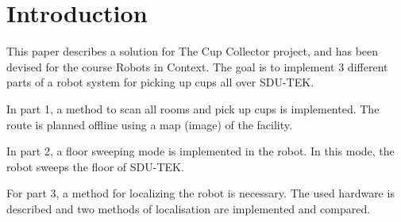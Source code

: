 \section{Introduction}
\label{sec:introduction}
This paper describes a solution for The Cup Collector project,
and has been devised for the course Robots in Context.
The goal is to implement 3 different parts of a robot system for picking up cups all over SDU-TEK. 

In part 1, a method to scan all rooms and pick up cups is implemented.
The route is planned offline using a map (image) of the facility. 

In part 2, a floor sweeping mode is implemented in the robot.
In this mode, the robot sweeps the floor of SDU-TEK.  

For part 3, a method for localizing the robot is necessary.
The used hardware is described and two methods of localisation are implemented and compared.